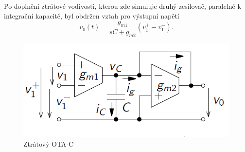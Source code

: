 Po doplnění ztrátové vodivosti, kterou zde simuluje druhý zesilovač, paralelně k integrační kapacitě, byl obdržen vztah pro výstupní napětí
\begin{equation}
v_0(t) = \frac{g_{m1}}{sC + g_{m2}}(v_1^+ - v_{1}^-).
\end{equation}
\begin{figure}[h]
\centering
\includegraphics[scale=0.5]{damp.png}
\caption[Ztrátový OTA-C]{Ztrátový OTA-C \cite{5}}
\end{figure}
